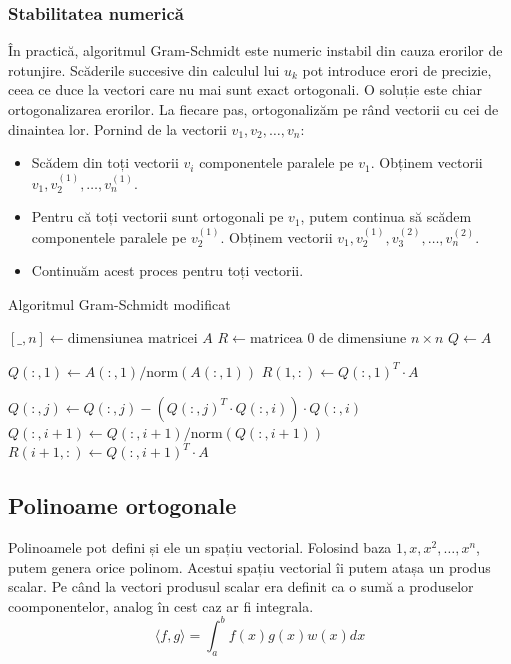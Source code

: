 \documentclass{exam}
\begin{document}
\subsubsection{Stabilitatea numerică}

În practică, algoritmul Gram-Schmidt este numeric instabil din cauza erorilor de
rotunjire. Scăderile succesive din calculul lui $u_k$ pot introduce erori de
precizie, ceea ce duce la vectori care nu mai sunt exact ortogonali. O soluție
este chiar ortogonalizarea erorilor. La fiecare pas, ortogonalizăm pe rând
vectorii cu cei de dinaintea lor. Pornind de la vectorii $v_1, v_2, \dots, v_n$:
\begin{itemize}
	\item Scădem din toți vectorii $v_i$ componentele paralele pe $v_1$. Obținem
	      vectorii $v_1, v_2^{(1)}, \dots, v_n^{(1)}$.
	\item Pentru că toți vectorii sunt ortogonali pe $v_1$, putem continua
	      să scădem componentele paralele pe $v_2^{(1)}$. Obținem vectorii
	      $v_1, v_2^{(1)}, v_3^{(2)}, \dots, v_n^{(2)}$.
	\item Continuăm acest proces pentru toți vectorii.
\end{itemize}

\begin{algorithm}
	\caption{Algoritmul Gram-Schmidt modificat}
	\begin{algorithmic}[1]
		\State \( [\_, n] \gets \text{dimensiunea matricei } A \)
		\State \( R \gets \text{matricea 0 de dimensiune } n \times n \)
		\State \( Q \gets A \)

		\State \( Q(:, 1) \gets A(:, 1) / \text{norm}(A(:, 1)) \)
		\State \( R(1, :) \gets Q(:, 1)^T \cdot A \)

		\State \( Q(:, j) \gets Q(:, j) - (Q(:, j)^T \cdot Q(:, i)) \cdot Q(:, i) \)
		\EndFor
		\State \( Q(:, i+1) \gets Q(:, i+1) / \text{norm}(Q(:, i+1)) \)
		\State \( R(i+1, :) \gets Q(:, i+1)^T \cdot A \)
		\EndFor
	\end{algorithmic}
\end{algorithm}

\subsection{Polinoame ortogonale}

Polinoamele pot defini și ele un spațiu vectorial. Folosind baza ${1, x, x^2, \dots, x^n}$,
putem genera orice polinom. Acestui spațiu vectorial îi putem atașa un produs
scalar. Pe când la vectori produsul scalar era definit ca o sumă a produselor
coomponentelor, analog în cest caz ar fi integrala.
\begin{equation*}
	\langle f, g \rangle = \int_{a}^{b} f(x) g(x) w(x) dx
\end{equation*}
\end{document}
